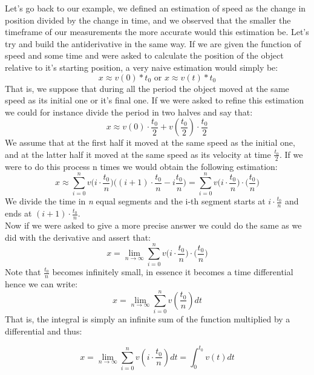 \documentclass[11pt]{article}
\begin{document}
Let's go back to our example, we defined an estimation of speed as the change in
position divided by the change in time, and we observed that the smaller the
timeframe of our measurements the more accurate would this estimation be. Let's
try and build the antiderivative in the same way.
If we are given the function of speed and some time and were asked to calculate
the position of the object relative to it's starting position, a very naive
estimation would simply be:
\[
x \approx v(0)*t_{0} \text{ or } x \approx v(t)*t_{0}
\]
That is, we suppose that during all the period the object moved at the same
speed as its initial one or it's final one. If we were asked to refine this estimation we could
for instance divide the period in two halves and say that: \[
x \approx v(0)\cdot\frac{t_{0}}{2} + v(\frac{t_{0}}{2})\cdot\frac{t_{0}}{2}
\]
We assume that at the first half it moved at the same speed as the initial one,
and at the latter half it moved at the same speed as its velocity at time
\(\frac{t_{0}}{2}\).
If we were to do this process n times we would obtain the following estimation:
\begin{equation}
x \approx \sum_{i = 0}^{n} v\bigg(i\cdot\frac{t_{0}}{n}\bigg) \bigg((i+1)\cdot\frac{t_{0}}{n} - i
\frac{t_{0}}{n}\bigg) = \sum_{i = 0}^{n} v\bigg(i\cdot\frac{t_{0}}{n}\bigg)\cdot\bigg(\frac{t_{0}}{n}\bigg)
\end{equation}
We divide the time in \emph{n} equal segments and the i-th segment starts at
\(i\cdot\frac{t_{0}}{n}\) and ends at \((i+1)\cdot\frac{t_{0}}{n}\).\\
Now if we were asked to give a more precise answer we could do the same as we
did with the derivative and assert that:
\begin{equation}
x = \lim_{n\rightarrow \infty} \sum_{i = 0}^{n} v\bigg(i\cdot\frac{t_{0}}{n}\bigg)\cdot\bigg(\frac{t_{0}}{n}\bigg)
\end{equation}
Note that \(\frac{t_{0}}{n}\) becomes infinitely small, in essence it becomes
a time differential hence we can write:
\begin{equation}
x = \lim_{n\rightarrow \infty} \sum_{i = 0}^{n} v(\frac{t_{0}}{n})dt
\end{equation}
That is, the integral is simply an infinite sum of the function multiplied by a
differential and thus:

\begin{equation}
x = \lim_{n\rightarrow \infty} \sum_{i = 0}^{n} v(i \cdot \frac{t_{0}}{n})dt = \int_{0}^{t_{0}} v(t) dt
\end{equation}
\end{document}
